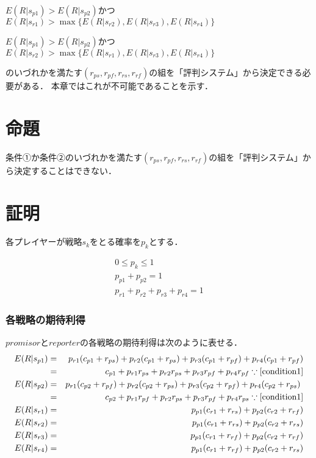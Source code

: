 \begin{description}
  \centering
  \item[条件①] $E(R|s_{p1})>E(R|s_{p2})$かつ$E(R|s_{r1})>\max\{E(R|s_{r2}), E(R|s_{r3}), E(R|s_{r4}) \}$
  \item[条件②] $E(R|s_{p1})>E(R|s_{p2})$かつ$E(R|s_{r2})>\max\{E(R|s_{r1}), E(R|s_{r3}), E(R|s_{r4}) \}$
\end{description}

のいづれかを満たす$(r_{ps}, r_{pf}, r_{rs}, r_{rf})$の組を「評判システム」から決定できる必要がある．
本章ではこれが不可能であることを示す．

\section{命題}
条件①か条件②のいづれかを満たす$(r_{ps}, r_{pf}, r_{rs}, r_{rf})$の組を「評判システム」から決定することはできない．
  
\section{証明}
\label{verification1}
各プレイヤーが戦略$s_{k}$をとる確率を$p_{k}$とする．

\begin{gather}
  0 \leq p_{k} \leq 1 \nonumber \\
  p_{p1} + p_{p2} = 1 \nonumber \\
  p_{r1} + p_{r2} + p_{r3} + p_{r4} = 1 \label{condition1}
\end{gather}

\subsubsection{各戦略の期待利得}
$promisor$と$reporter$の各戦略の期待利得は次のように表せる．
\begin{eqnarray}
  E(R|s_{p1}) &=& p_{r1} (c_{p1} + r_{ps}) + p_{r2} (c_{p1} + r_{ps}) + p_{r3} (c_{p1} + r_{pf}) + p_{r4} (c_{p1} + r_{pf}) \nonumber \\
              &=& c_{p1} + p_{r1} r_{ps} + p_{r2} r_{ps} + p_{r3} r_{pf} + p_{r4} r_{pf} \because\eqref{condition1} \label{expectedA} \\
  E(R|s_{p2}) &=& p_{r1} (c_{p2} + r_{pf}) + p_{r2} (c_{p2} + r_{ps}) + p_{r3} (c_{p2} + r_{pf} ) + p_{r4} (c_{p2} + r_{ps}) \nonumber \\
              &=& c_{p2} + p_{r1} r_{pf} + p_{r2} r_{ps} + p_{r3} r_{pf} + p_{r4} r_{ps} \because\eqref{condition1} \label{expectedB} \\
  E(R|s_{r1}) &=& p_{p1} (c_{r1} + r_{rs}) + p_{p2} (c_{r2} + r_{rf}) \label{expectedR1} \\
  E(R|s_{r2}) &=& p_{p1} (c_{r1} + r_{rs}) + p_{p2} (c_{r2} + r_{rs}) \label{expectedR2} \\
  E(R|s_{r3}) &=& p_{p1} (c_{r1} + r_{rf}) + p_{p2} (c_{r2} + r_{rf}) \label{expectedR3} \\
  E(R|s_{r4}) &=& p_{p1} (c_{r1} + r_{rf}) + p_{p2} (c_{r2} + r_{rs}) \label{expectedR4} \nonumber
\end{eqnarray}

